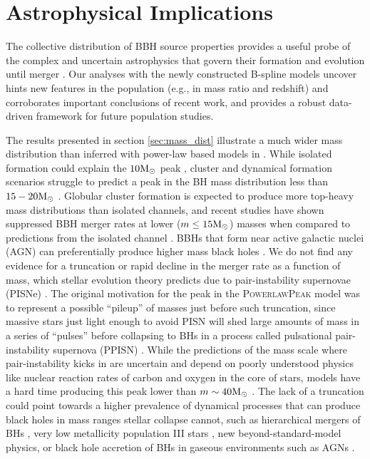 \section{Astrophysical Implications}\label{sec:astrodiscussion}

The collective distribution of BBH source properties provides a useful probe of the complex and uncertain astrophysics that govern their 
formation and evolution until merger \citep{Zevin_2017}. Our analyses with the newly constructed B-spline models uncover hints new features in the population (e.g., in mass ratio and redshift) and corroborates important 
conclusions of recent work, and provides a robust data-driven framework for future population studies. 

The results presented in section \ref{sec:mass_dist} illustrate a much wider mass distribution than inferred with power-law based models in \citet{o3b_astro_dist}. 
While isolated formation could explain the $10{\rm M}_\odot$ peak \citep{Antonini_2020}, cluster and dynamical formation scenarios struggle to predict a peak in the BH mass distribution less than 
$15-20{\rm M}_\odot$ \citep{Hong_2018, Rodriguez_2019}. Globular cluster formation is expected to produce more top-heavy mass distributions than isolated channels, and recent studies have shown suppressed BBH merger rates 
at lower ($m\leq15{\rm M}_\odot$) masses when compared to predictions from the isolated channel \citep{Rodriguez_2015, Rodriguez_2019, BaveraMassTransfer,Belczynski_2016}. BBHs that form near active galactic nuclei (AGN) can preferentially produce higher 
mass black holes \citep{FordAGN, Tagawa_2021, Yang_2019}. We do not find any evidence for a truncation or rapid decline in the merger rate as a function of mass, which stellar evolution theory predicts 
due to pair-instability supernovae (PISNe) \citep{Heger_2002,PISN_Woosley,Heger_2003,Spera_2017}. The original motivation for the peak in the \textsc{PowerlawPeak} model \citep{Talbot_2018} was to represent a possible ``pileup'' of 
masses just before such truncation, since massive stars just light enough to avoid PISN will shed large amounts of mass in a series of ``pulses'' before collapsing to BHs in a process called 
pulsational pair-instability supernova (PPISN) \citep{Woosley_2017,Woosley_2019,Farmer_2019}. While the predictions of the mass scale where pair-instability kicks in are uncertain and depend on poorly understood physics 
like nuclear reaction rates of carbon and oxygen in the core of stars, models have a hard time producing this peak lower than $m\sim40{\rm M}_\odot$ \citep{Belczynski_2016,Marchant_2019,Renzo_2020,Farmer_2019,Farmer_2020}. The lack of a truncation could 
point towards a higher prevalence of dynamical processes that can produce black holes in mass ranges stellar collapse cannot, such as hierarchical mergers of BHs \citep{Fishbach_2017,Doctor_2020,Kimball_genealogy,kimball2020evidence,doctor2021black,Fishbach_2022}, 
very low metallicity population III stars \citep{Belczynski_2020,Farrell_2020}, new beyond-standard-model physics\citep{Croon_newphysics,Sakstein_2020}, or black hole accretion of BHs in gaseous environments such as AGNs \citep{Secunda_2020,McKernan_2020,cruzosorio2021gw190521}. 


